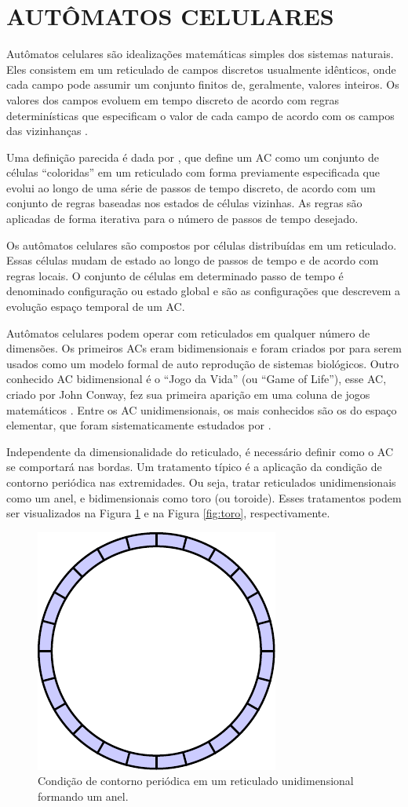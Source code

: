 \documentclass[12pt,a4paper]{article}
\let\stdsection\section
\renewcommand\section{\newpage\stdsection}
\begin{document}
\section{AUTÔMATOS CELULARES}\label{sec:acs}
Autômatos celulares são idealizações matemáticas simples dos sistemas naturais. Eles consistem em um reticulado de campos discretos usualmente idênticos, onde cada campo pode assumir um conjunto finitos de, geralmente, valores inteiros. Os valores dos campos evoluem em tempo discreto de acordo com regras determinísticas que especificam o valor de cada campo de acordo com os campos das vizinhanças \cite{wolfram1994cellular}.

Uma definição parecida é dada por , que define um AC como um conjunto de células ``coloridas'' em um reticulado com forma previamente especificada que evolui ao longo de uma série de passos de tempo discreto, de acordo com um conjunto de regras baseadas nos estados de células vizinhas. As regras são aplicadas de forma iterativa para o número de passos de tempo desejado.

Os autômatos celulares são compostos por células distribuídas em um reticulado. Essas células mudam de estado ao longo de passos de tempo e de acordo com regras locais. O conjunto de células em determinado passo de tempo é denominado configuração ou estado global e são as configurações que descrevem a evolução espaço temporal de um AC. 

Autômatos celulares podem operar com reticulados em qualquer número de dimensões. Os primeiros ACs eram bidimensionais e foram criados por  para serem usados como um modelo formal de auto reprodução de sistemas biológicos. Outro conhecido AC bidimensional é o ``Jogo da Vida'' (ou ``Game of Life''), esse AC, criado por John Conway, fez sua primeira aparição em uma coluna de jogos matemáticos \cite{GardnerM1970}. Entre os AC unidimensionais, os mais conhecidos são os do espaço elementar, que foram sistematicamente estudados por .

Independente da dimensionalidade do reticulado, é necessário definir como o AC se comportará nas bordas. Um tratamento típico é a aplicação da condição de contorno periódica nas extremidades. Ou seja, tratar reticulados unidimensionais como um anel, e bidimensionais como toro (ou toroide). Esses tratamentos podem ser visualizados na Figura \ref{fig:anel} e na Figura \ref{fig:toro}, respectivamente.  
	\begin{figure}[h!]
	  \centering
	  \includegraphics[width=.3\textwidth]{fig_circularList.pdf}
	  \caption{Condição de contorno periódica em um reticulado unidimensional formando um anel.}
	  \label{fig:anel}
	\end{figure}
\end{document}
